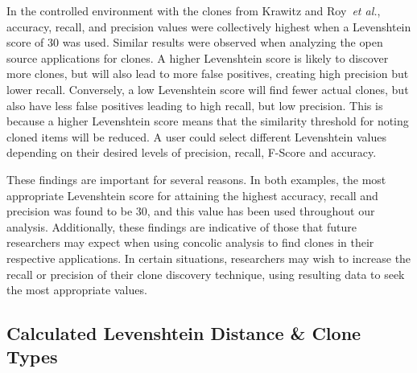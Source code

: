 \documentclass[smallextended]{svjour3}       %
\newcommand{\sam}[1]{\textcolor{green}{{\it [Sam says: #1]}}}
\begin{document}




In the controlled environment with the clones from Krawitz and Roy~\emph{et al.}, accuracy, recall, and precision values were collectively highest when a Levenshtein score of 30 was used. Similar results were observed when analyzing the open source applications for clones. A higher Levenshtein score is likely to discover more clones, but will also lead to more false positives, creating high precision but lower recall. Conversely, a low Levenshtein score will find fewer actual clones, but also have less false positives leading to high recall, but low precision. This is because a higher Levenshtein score means that the similarity threshold for noting cloned items will be reduced. A user could select different Levenshtein values depending on their desired levels of precision, recall, F-Score and accuracy.

These findings are important for several reasons. In both examples, the most appropriate Levenshtein score for attaining the highest accuracy, recall and precision was found to be 30, and this value has been used throughout our analysis. Additionally, these findings are indicative of those that future researchers may expect when using concolic analysis to find clones in their respective applications. In certain situations, researchers may wish to increase the recall or precision of their clone discovery technique, using resulting data to seek the most appropriate values.


\subsection{Calculated Levenshtein Distance \& Clone Types}
\end{document}
